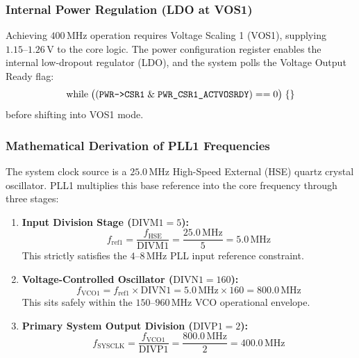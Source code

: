 \subsubsection{Internal Power Regulation (LDO at VOS1)}
Achieving $400\,\text{MHz}$ operation requires Voltage Scaling 1 (VOS1), supplying $1.15\text{--}1.26\,\text{V}$
to the core logic. The power configuration register  enables the internal low-dropout
regulator (LDO), and the system polls the Voltage Output Ready flag:
\begin{equation}
  \text{while} \;\big((\code{PWR->CSR1} \;\&\; \code{PWR_CSR1_ACTVOSRDY}) == 0\big) \; \{ \}
\end{equation}
before shifting  into VOS1 mode.

\subsubsection{Mathematical Derivation of PLL1 Frequencies}
The system clock source is a $25.0\,\text{MHz}$ High-Speed External (HSE) quartz crystal oscillator.
PLL1 multiplies this base reference into the core frequency through three stages:
\begin{enumerate}
  \item \textbf{Input Division Stage ($\text{DIVM1} = 5$):}
        \begin{equation}
          f_{\text{ref1}} = \frac{f_{\text{HSE}}}{\text{DIVM1}} = \frac{25.0\,\text{MHz}}{5} = 5.0\,\text{MHz}
        \end{equation}
        This strictly satisfies the $4\text{--}8\,\text{MHz}$ PLL input reference constraint.
  \item \textbf{Voltage-Controlled Oscillator ($\text{DIVN1} = 160$):}
        \begin{equation}
          f_{\text{VCO1}} = f_{\text{ref1}} \times \text{DIVN1} = 5.0\,\text{MHz} \times 160 = 800.0\,\text{MHz}
        \end{equation}
        This sits safely within the $150\text{--}960\,\text{MHz}$ VCO operational envelope.
  \item \textbf{Primary System Output Division ($\text{DIVP1} = 2$):}
        \begin{equation}
          f_{\text{SYSCLK}} = \frac{f_{\text{VCO1}}}{\text{DIVP1}} = \frac{800.0\,\text{MHz}}{2} = 400.0\,\text{MHz}
        \end{equation}
\end{enumerate}

